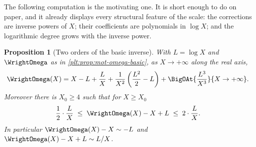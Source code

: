 \documentclass[11pt,oneside]{article}
\theoremstyle{plain}
\newtheorem{proposition}[theorem]{Proposition}
\theoremstyle{definition}
\theoremstyle{remark}
\begin{document}
The following computation is the motivating one.  It is short enough to do on
paper, and it already displays every structural feature of the scale: the
corrections are inverse powers of \(X\); their coefficients are polynomials in
\(\log X\); and the logarithmic degree grows with the inverse power.

\begin{proposition}[Two orders of the basic inverse]
\label{plt:prop:mot-two-orders}
With \(L=\log X\) and \(\WrightOmega\) as in
\cref{plt:prop:mot-omega-basic}, as \(X\to+\infty\) along the real axis,
\begin{equation}\label{plt:eq:mot-two-orders}
  \WrightOmega(X)
  =X-L+\frac{L}{X}+\frac{1}{X^{2}}\left(\frac{L^{2}}{2}-L\right)
   +\BigOAt{\frac{L^{3}}{X^{3}}}{X\to+\infty}.
\end{equation}
Moreover there is \(X_{0}\ge4\) such that for \(X\ge X_{0}\)
\begin{equation}\label{plt:eq:mot-psi2-envelope}
  \frac{1}{2}\cdot\frac{L}{X}
  \;\le\;\WrightOmega(X)-X+L\;\le\;
  2\cdot\frac{L}{X}.
\end{equation}
In particular \(\WrightOmega(X)-X\sim-L\) and
\(\WrightOmega(X)-X+L\sim L/X\).
\end{proposition}
\end{document}

